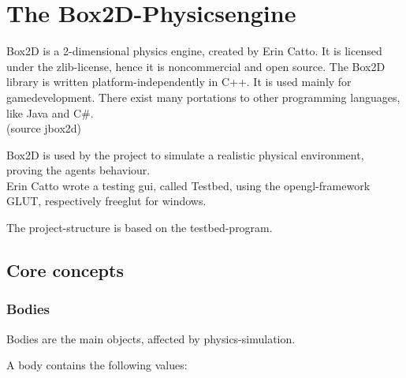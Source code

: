 \documentclass[10pt,a4paper,DIV=11]{scrreprt}
\begin{document}
\chapter{The Box2D-Physicsengine}
Box2D is a 2-dimensional physics engine, created by Erin Catto. It is licensed under the zlib-license, hence it is noncommercial and open source. The Box2D library is written platform-independently in C++. It is used mainly for gamedevelopment. There exist many portations to other programming languages, like Java and C\#. \\
(source jbox2d)


Box2D is used by the project to simulate a realistic physical environment, proving the agents behaviour. \\

Erin Catto wrote a testing gui, called Testbed, using the opengl-framework GLUT, respectively freeglut for windows.

The project-structure is based on the testbed-program.


\section{Core concepts}

\subsection{Bodies}
Bodies are the main objects, affected by physics-simulation.

A body contains the following values: \\

   \\
\\
\end{document}
